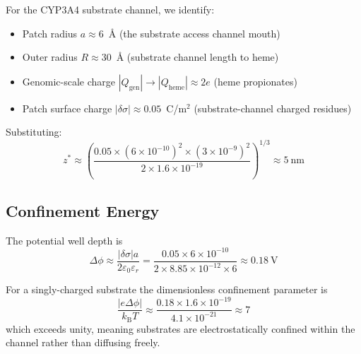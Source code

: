 \documentclass[11pt,twocolumn,a4paper]{article}
\theoremstyle{definition}
\theoremstyle{remark}
\newcommand{\kB}{k_{\mathrm{B}}}
\begin{document}
For the CYP3A4 substrate channel, we identify:
\begin{itemize}[nosep]
\item Patch radius $a \approx 6$~\AA{} (the substrate access channel mouth)
\item Outer radius $R \approx 30$~\AA{} (substrate channel length to heme)
\item Genomic-scale charge $|Q_{\mathrm{gen}}| \to |Q_{\mathrm{heme}}| \approx 2e$ (heme propionates)
\item Patch surface charge $|\delta\sigma| \approx 0.05$~C/m$^2$ (substrate-channel charged residues)
\end{itemize}

Substituting:
\begin{equation}
z^* \approx \left(\frac{0.05 \times (6 \times 10^{-10})^2 \times (3 \times 10^{-9})^2}{2 \times 1.6 \times 10^{-19}}\right)^{1/3}
\approx 5~\mathrm{nm}
\label{eq:chamber_z_value}
\end{equation}

\subsection{Confinement Energy}

The potential well depth is
\begin{equation}
\Delta\phi \approx \frac{|\delta\sigma| a}{2 \varepsilon_0 \varepsilon_r}
= \frac{0.05 \times 6 \times 10^{-10}}{2 \times 8.85 \times 10^{-12} \times 6}
\approx 0.18~\mathrm{V}
\label{eq:chamber_phi}
\end{equation}

For a singly-charged substrate the dimensionless confinement parameter is
\begin{equation}
\frac{|e\Delta\phi|}{\kB T} \approx \frac{0.18 \times 1.6 \times 10^{-19}}{4.1 \times 10^{-21}} \approx 7
\end{equation}
which exceeds unity, meaning substrates are electrostatically confined within the channel rather than diffusing freely.
\end{document}
